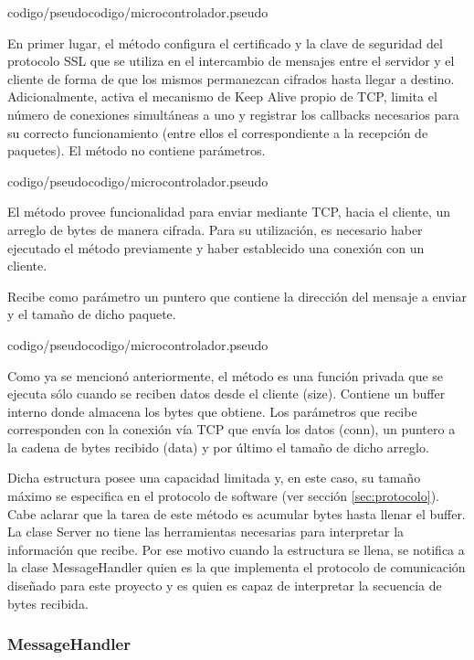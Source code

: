  {codigo/pseudocodigo/microcontrolador.pseudo}

En primer lugar, el método  configura el certificado y la clave de seguridad del protocolo SSL que se utiliza en el intercambio de mensajes entre el servidor y el cliente de forma de que los mismos permanezcan cifrados hasta llegar a destino.
Adicionalmente, activa el mecanismo de Keep Alive propio de TCP, limita el número de conexiones simultáneas a uno y registrar los callbacks necesarios para su correcto funcionamiento (entre ellos el correspondiente a la recepción de paquetes).
El método no contiene parámetros.

 {codigo/pseudocodigo/microcontrolador.pseudo}

El método  provee funcionalidad para enviar mediante TCP, hacia el cliente, un arreglo de bytes de manera cifrada.
Para su utilización, es necesario haber ejecutado el método  previamente y haber establecido una conexión con un cliente.

Recibe como parámetro un puntero que contiene la dirección del mensaje a enviar y el tamaño de dicho paquete.

 {codigo/pseudocodigo/microcontrolador.pseudo}

Como ya se mencionó anteriormente, el método  es una función privada que se ejecuta sólo cuando se reciben datos desde el cliente (size).
Contiene un buffer interno donde almacena los bytes que obtiene.
Los parámetros que recibe corresponden con la conexión vía TCP que envía los datos (conn), un puntero a la cadena de bytes recibido (data) y por último el tamaño de dicho arreglo.

Dicha estructura posee una capacidad limitada y, en este caso, su tamaño máximo se especifica en el protocolo de software (ver sección \ref{sec:protocolo}).
Cabe aclarar que la tarea de este método es acumular bytes hasta llenar el buffer. La clase Server no tiene las herramientas necesarias para interpretar la información que recibe.
Por ese motivo cuando la estructura se llena, se notifica a la clase MessageHandler quien es la que implementa el protocolo de comunicación diseñado para este proyecto y es quien es capaz de interpretar la secuencia de bytes recibida.



\subsubsection{MessageHandler}

